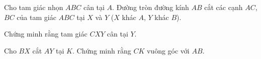 \begin{practice}
\begin{questions}[series=SBT]
        \item Cho tam giác nhọn $ABC$ cân tại $A$. Đường tròn đường kính $AB$ cắt các cạnh $AC$, $BC$ của tam giác $ABC$ tại $X$ và $Y$ ($X$ khác $A$, $Y$ khác $B$).
        \begin{questions}
            \item Chứng minh rằng tam giác $CXY$ cân tại $Y$.
            \item Cho $BX$ cắt $AY$ tại $K$. Chứng minh rằng $CK$ vuông góc với $AB$.
        \end{questions}

        \answerline
        \answerline
        \answerline
        \answerline
    \end{questions}
\end{practice}
